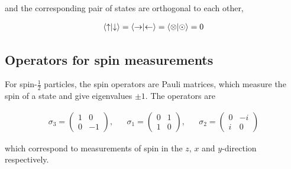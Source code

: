 \documentclass[12pt]{book} %
\numberwithin{equation}{chapter}
\def\s{\sigma}
\begin{document}
\noindent and the corresponding pair of states are orthogonal to each other,
\begin{eqnbox}
\begin{align}
\braket{\uparrow}{\downarrow}=\braket{\rightarrow}{\leftarrow}=\braket{\otimes}{\odot}=0
\end{align}
\end{eqnbox}

\subsection*{Operators for spin measurements}
For spin-$\frac{1}{2}$ particles, the spin operators are Pauli matrices, which measure the spin of a state and give eigenvalues $\pm1$. The operators are
\begin{eqnbox}
\begin{align}
\s_{3}=
\begin{pmatrix}
1&0\\
0&-1
\end{pmatrix}, &&
\s_{1}=
\begin{pmatrix}
0&1\\
1&0
\end{pmatrix}, &&
\s_{2}=
\begin{pmatrix}
0&-i\\
i&0
\end{pmatrix}
\end{align}
\end{eqnbox}
which correspond to measurements of spin in the $z$, $x$ and $y$-direction respectively.
\end{document}

